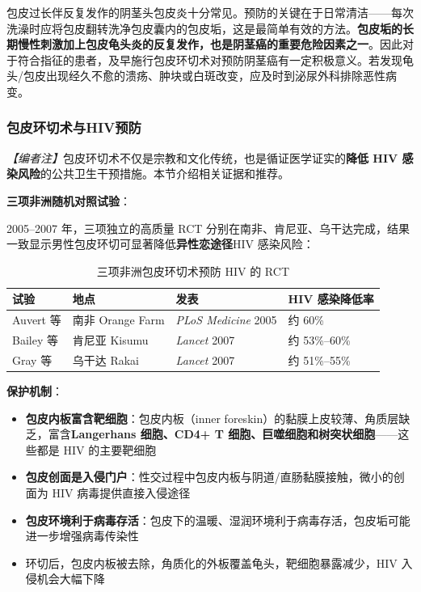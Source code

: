 \begin{tcolorbox}[colback=pink!5!white,colframe=red!50!black,title=贴心小叮咛]
包皮过长伴反复发作的阴茎头包皮炎十分常见。预防的关键在于日常清洁——每次洗澡时应将包皮翻转洗净包皮囊内的包皮垢，这是最简单有效的方法。\textbf{包皮垢的长期慢性刺激加上包皮龟头炎的反复发作，也是阴茎癌的重要危险因素之一}。因此对于符合指征的患者，及早施行包皮环切术对预防阴茎癌有一定积极意义。若发现龟头/包皮出现经久不愈的溃疡、肿块或白斑改变，应及时到泌尿外科排除恶性病变。
\end{tcolorbox}

\subsubsection{包皮环切术与HIV预防}
\label{subsec:circumcision_hiv}

\noindent\textit{【编者注】}包皮环切术不仅是宗教和文化传统，也是循证医学证实的\textbf{降低 HIV 感染风险}的公共卫生干预措施。本节介绍相关证据和推荐。

\vspace{0.5em}
\noindent\textbf{三项非洲随机对照试验}：

2005--2007 年，三项独立的高质量 RCT 分别在南非、肯尼亚、乌干达完成，结果一致显示男性包皮环切可显著降低\textbf{异性恋途径}HIV 感染风险：

\begin{table}[htbp]
\centering
\caption{三项非洲包皮环切术预防 HIV 的 RCT}
\label{tab:circumcision_hiv_rct}
\begin{tabularx}{\textwidth}{@{}llXX@{}}
    \toprule
    \textbf{试验} & \textbf{地点} & \textbf{发表} & \textbf{HIV 感染降低率} \\
    \midrule
    Auvert 等 & 南非 Orange Farm & \textit{PLoS Medicine} 2005 & 约 60\% \\
    Bailey 等 & 肯尼亚 Kisumu & \textit{Lancet} 2007 & 约 53\%--60\% \\
    Gray 等 & 乌干达 Rakai & \textit{Lancet} 2007 & 约 51\%--55\% \\
    \bottomrule
\end{tabularx}
\end{table}

\vspace{0.5em}
\noindent\textbf{保护机制}：

\begin{itemize}[leftmargin=2cm]
	\item \textbf{包皮内板富含靶细胞}：包皮内板（inner foreskin）的黏膜上皮较薄、角质层缺乏，富含\textbf{Langerhans 细胞、CD4+ T 细胞、巨噬细胞和树突状细胞}——这些都是 HIV 的主要靶细胞
	\item \textbf{包皮创面是入侵门户}：性交过程中包皮内板与阴道/直肠黏膜接触，微小的创面为 HIV 病毒提供直接入侵途径
	\item \textbf{包皮环境利于病毒存活}：包皮下的温暖、湿润环境利于病毒存活，包皮垢可能进一步增强病毒传染性
	\item 环切后，包皮内板被去除，角质化的外板覆盖龟头，靶细胞暴露减少，HIV 入侵机会大幅下降
\end{itemize}

